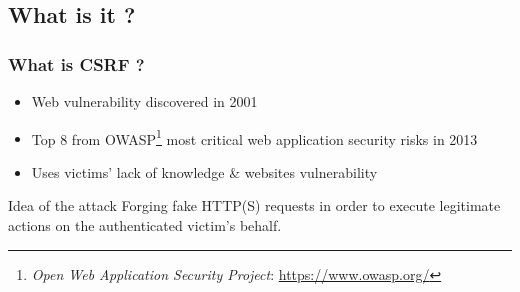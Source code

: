 \documentclass[svgnames]{beamer}
\begin{document}
\subsection{What is it ?}
\begin{frame}
  \frametitle{What is CSRF ?}
  
  \begin{itemize}
   \item Web vulnerability discovered in 2001
   \item Top 8 from OWASP\footnote{\textit{Open Web Application 
       Security Project}: \url{https://www.owasp.org/}} most critical 
   web application security risks in 2013
   \item Uses victims' lack of knowledge \& websites vulnerability
  \end{itemize}
  
  \pause
  
  \begin{block}{Idea of the attack}
    Forging fake HTTP(S) requests in order to execute legitimate actions on the 
    authenticated victim's behalf.
  \end{block}



\end{frame}

\end{document}
